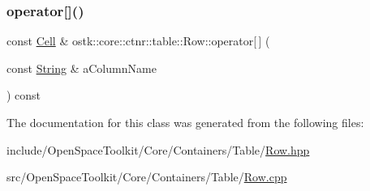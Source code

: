 \mbox{\label{classostk_1_1core_1_1ctnr_1_1table_1_1_row_a6eb22961d8f6a110582f2d4690e89407}} 
\subsubsection{\texorpdfstring{operator[]()}{operator[]()}\hspace{0.1cm}{\footnotesize\ttfamily [2/2]}}
{\footnotesize\ttfamily const \hyperlink{namespaceostk_1_1core_1_1ctnr_1_1table_a697fb8eda17fde15703741a0c49036b9}{Cell} \& ostk\+::core\+::ctnr\+::table\+::\+Row\+::operator\mbox{[}$\,$\mbox{]} (\begin{DoxyParamCaption}\item[{const \hyperlink{classostk_1_1core_1_1types_1_1_string}{String} \&}]{a\+Column\+Name }\end{DoxyParamCaption}) const}



The documentation for this class was generated from the following files\+:\begin{DoxyCompactItemize}
\item 
include/\+Open\+Space\+Toolkit/\+Core/\+Containers/\+Table/\hyperlink{_row_8hpp}{Row.\+hpp}\item 
src/\+Open\+Space\+Toolkit/\+Core/\+Containers/\+Table/\hyperlink{_row_8cpp}{Row.\+cpp}\end{DoxyCompactItemize}
